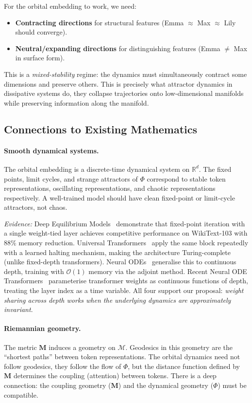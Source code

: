 \documentclass[11pt, a4paper]{article}
\newcommand{\M}{\mathbf{M}}
\newcommand{\R}{\mathbb{R}}
\newcommand{\calM}{\mathcal{M}}
\newcommand{\calO}{\mathcal{O}}
\theoremstyle{remark}
\begin{document}
For the orbital embedding to work, we need:
\begin{itemize}[nosep]
    \item \textbf{Contracting directions} for structural features (Emma $\approx$ Max $\approx$ Lily should converge).
    \item \textbf{Neutral/expanding directions} for distinguishing features (Emma $\neq$ Max in surface form).
\end{itemize}

This is a \emph{mixed-stability} regime: the dynamics must simultaneously contract some dimensions and preserve others.
This is precisely what attractor dynamics in dissipative systems do, they collapse trajectories onto low-dimensional manifolds while preserving information along the manifold.

\subsection{Connections to Existing Mathematics}

\paragraph{Smooth dynamical systems.}
The orbital embedding is a discrete-time dynamical system on $\R^d$.
The fixed points, limit cycles, and strange attractors of $\Phi$ correspond to stable token representations, oscillating representations, and chaotic representations respectively.
A well-trained model should have clean fixed-point or limit-cycle attractors, not chaos.

\textit{Evidence:} Deep Equilibrium Models~\cite{bai2019deep} demonstrate that fixed-point iteration with a single weight-tied layer achieves competitive performance on WikiText-103 with 88\% memory reduction.
Universal Transformers~\cite{dehghani2018universal} apply the same block repeatedly with a learned halting mechanism, making the architecture Turing-complete (unlike fixed-depth transformers).
Neural ODEs~\cite{chen2018neural} generalise this to continuous depth, training with $\calO(1)$ memory via the adjoint method.
Recent Neural ODE Transformers~\cite{neuralode2025transformer} parameterise transformer weights as continuous functions of depth, treating the layer index as a time variable.
All four support our proposal: \emph{weight sharing across depth works when the underlying dynamics are approximately invariant}.

\paragraph{Riemannian geometry.}
The metric $\M$ induces a geometry on $\calM$.
Geodesics in this geometry are the ``shortest paths'' between token representations.
The orbital dynamics need not follow geodesics, they follow the flow of $\Phi$, but the distance function defined by $\M$ determines the coupling (attention) between tokens.
There is a deep connection: the coupling geometry ($\M$) and the dynamical geometry ($\Phi$) must be compatible.
\end{document}
